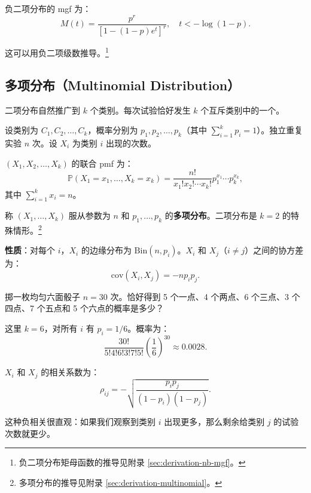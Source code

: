 \begin{example}\label{rmk:negative-binomial-mgf-ch3}
负二项分布的 mgf 为：
\[
M(t) = \frac{p^{r}}{[1 - (1-p)e^{t}]^{r}}, \quad t < -\log(1-p).
\]

这可以用负二项级数推导。\footnote{负二项分布矩母函数的推导见附录 \cref{sec:derivation-nb-mgf}。}
\end{example}

\subsection{多项分布（Multinomial Distribution）}\label{sub:multinomial-ch3}

二项分布自然推广到 $k$ 个类别。每次试验恰好发生 $k$ 个互斥类别中的一个。

设类别为 $C_1, C_2, \ldots, C_k$，概率分别为 $p_1, p_2, \ldots, p_k$（其中 $\sum_{i=1}^{k} p_i = 1$）。独立重复实验 $n$ 次。设 $X_i$ 为类别 $i$ 出现的次数。

$(X_1, X_2, \ldots, X_k)$ 的联合 pmf 为：
\begin{equation}\label{eq:multinomial-pmf-ch3}
\mathbb{P}(X_1 = x_1, \ldots, X_k = x_k) = \frac{n!}{x_1! x_2! \cdots x_k!} p_1^{x_1} \cdots p_k^{x_k},
\end{equation}
其中 $\sum_{i=1}^{k} x_i = n$。

称 $(X_1, \ldots, X_k)$ 服从参数为 $n$ 和 $p_1, \ldots, p_k$ 的\textbf{多项分布}。二项分布是 $k=2$ 的特殊情形。\footnote{多项分布的推导见附录 \cref{sec:derivation-multinomial}。}

\textbf{性质}：对每个 $i$，$X_i$ 的边缘分布为 $\text{Bin}(n, p_i)$。$X_i$ 和 $X_j$（$i \neq j$）之间的协方差为：
\begin{equation}\label{eq:multinomial-covariance-ch3}
\text{cov}(X_i, X_j) = -np_i p_j.
\end{equation}

\begin{example}[掷骰子]\label{ex:multinomial-dice-ch3}
掷一枚均匀六面骰子 $n = 30$ 次。恰好得到 5 个一点、4 个两点、6 个三点、3 个四点、7 个五点和 5 个六点的概率是多少？

这里 $k=6$，对所有 $i$ 有 $p_i = 1/6$。概率为：
\[
\frac{30!}{5!4!6!3!7!5!} \left(\frac{1}{6}\right)^{30} \approx 0.0028.
\]
\end{example}

\begin{example}\label{rmk:multinomial-correlation-ch3}
$X_i$ 和 $X_j$ 的相关系数为：
\[
\rho_{ij} = -\sqrt{\frac{p_i p_j}{(1-p_i)(1-p_j)}}.
\]

这种负相关很直观：如果我们观察到类别 $i$ 出现更多，那么剩余给类别 $j$ 的试验次数就更少。
\end{example}

